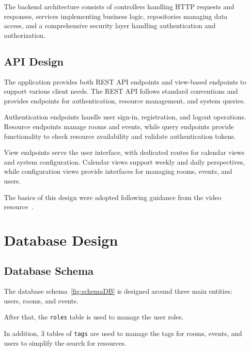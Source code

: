 The backend architecture consists of controllers handling HTTP requests and responses, services implementing business logic, repositories managing data access, and a comprehensive security layer handling authentication and authorization.

\subsection{API Design}\label{subsec:api-design}

The application provides both REST API endpoints and view-based endpoints to support various client needs.
The REST API follows standard conventions and provides endpoints for authentication, resource management, and system queries.

Authentication endpoints handle user sign-in, registration, and logout operations.
Resource endpoints manage rooms and events, while query endpoints provide functionality to check resource availability and validate authentication tokens.

View endpoints serve the user interface, with dedicated routes for calendar views and system configuration.
Calendar views support weekly and daily perspectives, while configuration views provide interfaces for managing rooms, events, and users.

The basics of this design were adopted following guidance from the video resource~\cite{VisualComputerScience2023}.


\section{Database Design}\label{sec:database-design}

\subsection{Database Schema}\label{subsec:database-schema}
The database schema~\ref{fig:schemaDB} is designed around three main entities: users, rooms, and events.

After that, the \texttt{roles} table is used to manage the user roles.

In addition, 3 tables of \texttt{tags} are used to manage the tags for rooms, events, and users to simplify the search for resources.

